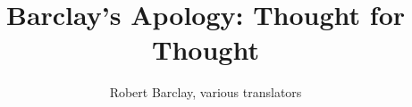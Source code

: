 

\title{Barclay's Apology: Thought for Thought}
\author{Robert Barclay, various translators}


	
	\maketitle
	
	
	

